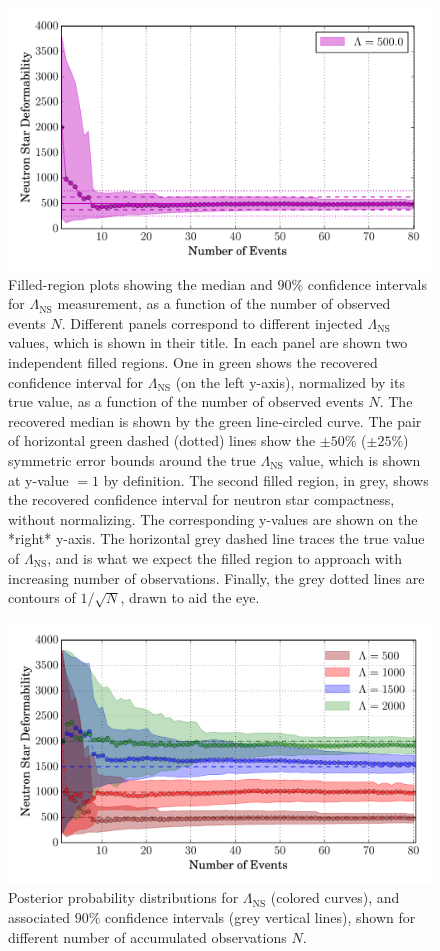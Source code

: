 \documentclass[aps,prd,amsmath,floats,floatfix, twocolumn,
superscriptaddress,nofootinbib,showpacs]{revtex4-1}
\newcommand{\lambdans}{\Lambda_\mathrm{NS}}
\begin{document}
\begin{figure}
\includegraphics[width=.67\columnwidth]{plots/FillBetweenErrorBarsLambda_vs_N_L500.pdf}
\caption{Filled-region plots showing the median and $90\%$ confidence intervals
for $\lambdans$ measurement, as a function of the number of observed events $N$.
Different panels correspond to different injected $\lambdans$ values, which is shown
in their title. In each panel are shown two independent filled regions. 
%  
 One in green shows the recovered confidence interval
 for $\lambdans$ (on the left y-axis), normalized by its true value,
 as a function of the 
 number of observed events $N$. The recovered median is shown by the
 green line-circled curve. The pair of horizontal green dashed (dotted)
 lines show the $\pm 50\%$ ($\pm 25\%$) symmetric error bounds around
 the true $\lambdans$ value, which is shown at y-value $=1$ by definition.
% 
 The second filled region, in grey, shows the recovered
 confidence interval for neutron star compactness, without normalizing.
 The corresponding y-values are shown on the *right* y-axis. The horizontal grey
 dashed line traces the true value of $\lambdans$, and is what we expect
 the filled region to approach with increasing number of observations.
%  
 Finally, the grey dotted lines are contours of $1/\sqrt{N}$, drawn to aid the eye.
}
\label{fig:TT_Lambda_vs_N_L500_2000_CI90_0}
\end{figure}
%
\begin{figure}
\centering    
\includegraphics[width=1.05\columnwidth]{plots/FillBetweenRelErrorBarsLambda_vs_NShifted_AllLambda.pdf}
\caption{%
Posterior probability distributions for $\lambdans$ (colored curves), and 
associated $90\%$ confidence intervals (grey vertical lines), shown for 
different number of accumulated observations $N$.
}
\label{fig:TT_Lambda_vs_N_CI90_0}
\end{figure}
\end{document}
